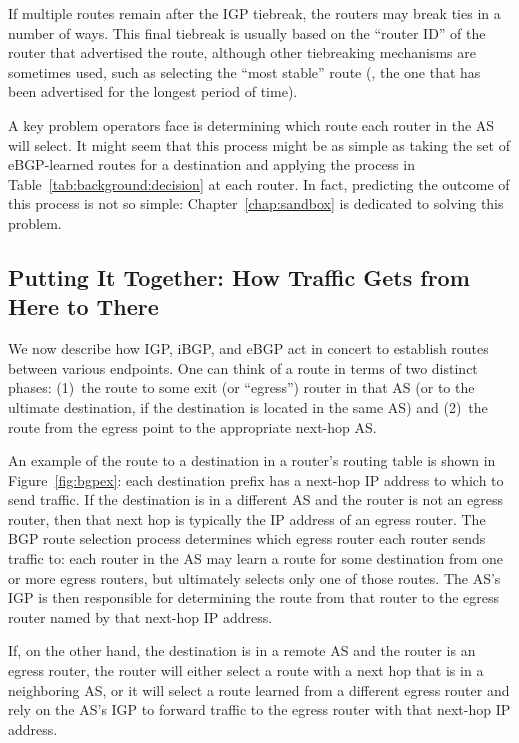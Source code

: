 If multiple routes remain after the IGP tiebreak, the routers may break
ties in a number of ways.  This final tiebreak is usually based on the
``router ID'' of the router that advertised the route, although other
tiebreaking mechanisms are sometimes used, such as selecting the ``most
stable'' route (\ie, the one that has been advertised for the longest
period of time).

A key problem operators face is determining which route each router in
the AS will select.  It might seem that this process might be as simple
as taking the set of eBGP-learned routes for a destination and applying
the process in Table~\ref{tab:background:decision} at each router.  In
fact, predicting the outcome of this process is not so simple:
Chapter~\ref{chap:sandbox} is 
dedicated to solving this problem.


\subsection{Putting It Together: How Traffic Gets from Here to There}

We now describe how IGP, iBGP, and eBGP act in
concert to establish routes between various endpoints.  One can think of
a route in terms of two distinct phases: (1)~the route to some exit (or
``egress'') router in that AS (or to the ultimate destination, if the
destination is located in the same AS) and (2)~the route from the egress
point to the appropriate next-hop AS.


An example of the route to a destination in a router's routing table is
shown in Figure~\ref{fig:bgpex}: each destination prefix has a next-hop
IP address to which to send traffic.  If the destination is in a different
AS and the router is not an egress router, then that next hop is
typically the IP address of an egress router.  The BGP route selection
process determines which egress router each router sends
traffic to: each router in the AS may learn a route for some destination
from one or more egress routers, but ultimately selects only one of
those routes.  The AS's IGP is then responsible for determining the
route from that router to the egress router named by that next-hop IP
address.

If, on the other hand, the destination is in a remote AS and the router
is an egress router, the router will either select a route with a next
hop that is in a neighboring AS, or it will select a route learned from
a different egress router and rely on the AS's IGP to forward traffic to
the egress router with that next-hop IP address.


